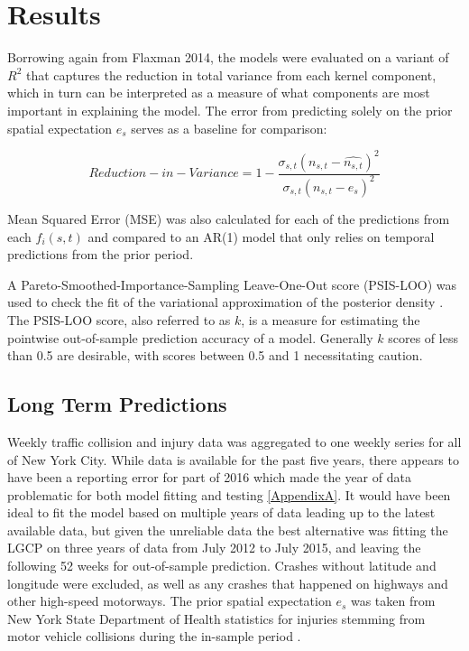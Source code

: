 \chapter{Results}
\label{results}

Borrowing again from Flaxman 2014, the models were evaluated on a variant of $R^2$ that captures the reduction in total variance from each kernel component, which in turn can be interpreted as a measure of what components are most important in explaining the model. The error from predicting solely on the prior spatial expectation $e_s$ serves as a baseline for comparison:

$$ Reduction-in-Variance = 1 - \frac{\sigma_{s,t}(n_{s,t}- \hat{n_{s,t}})^2}{\sigma_{s,t}(n_{s,t} - e_{s})^2}$$

Mean Squared Error (MSE) was also calculated for each of the predictions from each $f_i(s,t)$ and compared to an AR(1) model that only relies on temporal predictions from the prior period. \par

A Pareto-Smoothed-Importance-Sampling Leave-One-Out score (PSIS-LOO) was used to check the fit of the variational approximation of the posterior density \cite{vehtari_loo}. The PSIS-LOO score, also referred to as $k$, is a measure for estimating the pointwise out-of-sample prediction accuracy of a model. Generally $k$ scores of less than 0.5 are desirable, with scores between 0.5 and 1 necessitating caution.


\section{Long Term Predictions}

 Weekly traffic collision and injury data was aggregated to one weekly series for all of New York City. While data is available for the past five years, there appears to have been a reporting error for part of 2016 which made the year of data problematic for both model fitting and testing \ref{AppendixA}. It would have been ideal to fit the model based on multiple years of data leading up to the latest available data, but given the unreliable data the best alternative was fitting the LGCP on three years of data from July 2012 to July 2015, and leaving the following 52 weeks for out-of-sample prediction.  Crashes without latitude and longitude were excluded, as well as any crashes that happened on highways and other high-speed motorways. The prior spatial expectation $e_s$ was taken from New York State Department of Health statistics for injuries stemming from motor vehicle collisions during the in-sample period \cite{nys_crash_stats}. \par

